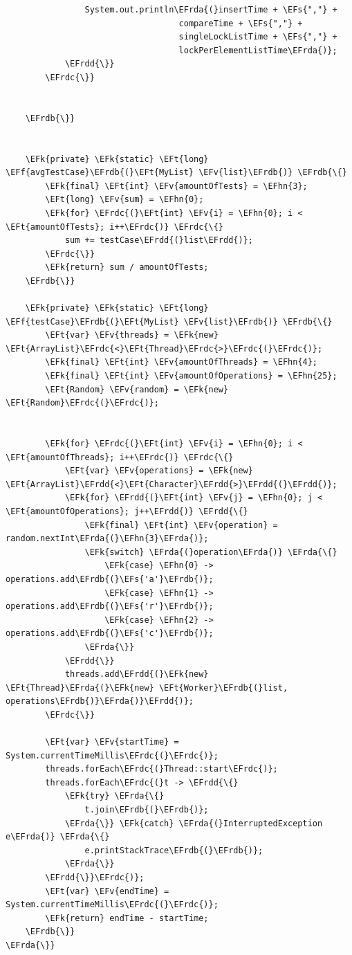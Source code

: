 \documentclass[11pt]{article}
\newcommand{\EFs}[1]{\textcolor{EFs}{#1}} %
\newcommand{\EFk}[1]{\textcolor{EFk}{#1}} %
\newcommand{\EFf}[1]{\textcolor{EFf}{#1}} %
\newcommand{\EFv}[1]{\textcolor{EFv}{#1}} %
\newcommand{\EFt}[1]{\textcolor{EFt}{#1}} %
\newcommand{\EFhn}[1]{\textcolor{EFhn}{#1}} %
\newcommand{\EFrda}[1]{#1} %
\newcommand{\EFrdb}[1]{\textcolor{EFrdb}{#1}} %
\newcommand{\EFrdc}[1]{\textcolor{EFrdc}{#1}} %
\newcommand{\EFrdd}[1]{\textcolor{EFrdd}{#1}} %
\begin{document}
\begin{Code}
\begin{Verbatim}
                System.out.println\EFrda{(}insertTime + \EFs{","} +
                                   compareTime + \EFs{","} +
                                   singleLockListTime + \EFs{","} +
                                   lockPerElementListTime\EFrda{)};
            \EFrdd{\}}
        \EFrdc{\}}


    \EFrdb{\}}


    \EFk{private} \EFk{static} \EFt{long} \EFf{avgTestCase}\EFrdb{(}\EFt{MyList} \EFv{list}\EFrdb{)} \EFrdb{\{}
        \EFk{final} \EFt{int} \EFv{amountOfTests} = \EFhn{3};
        \EFt{long} \EFv{sum} = \EFhn{0};
        \EFk{for} \EFrdc{(}\EFt{int} \EFv{i} = \EFhn{0}; i < \EFt{amountOfTests}; i++\EFrdc{)} \EFrdc{\{}
            sum += testCase\EFrdd{(}list\EFrdd{)};
        \EFrdc{\}}
        \EFk{return} sum / amountOfTests;
    \EFrdb{\}}

    \EFk{private} \EFk{static} \EFt{long} \EFf{testCase}\EFrdb{(}\EFt{MyList} \EFv{list}\EFrdb{)} \EFrdb{\{}
        \EFt{var} \EFv{threads} = \EFk{new} \EFt{ArrayList}\EFrdc{<}\EFt{Thread}\EFrdc{>}\EFrdc{(}\EFrdc{)};
        \EFk{final} \EFt{int} \EFv{amountOfThreads} = \EFhn{4};
        \EFk{final} \EFt{int} \EFv{amountOfOperations} = \EFhn{25};
        \EFt{Random} \EFv{random} = \EFk{new} \EFt{Random}\EFrdc{(}\EFrdc{)};


        \EFk{for} \EFrdc{(}\EFt{int} \EFv{i} = \EFhn{0}; i < \EFt{amountOfThreads}; i++\EFrdc{)} \EFrdc{\{}
            \EFt{var} \EFv{operations} = \EFk{new} \EFt{ArrayList}\EFrdd{<}\EFt{Character}\EFrdd{>}\EFrdd{(}\EFrdd{)};
            \EFk{for} \EFrdd{(}\EFt{int} \EFv{j} = \EFhn{0}; j < \EFt{amountOfOperations}; j++\EFrdd{)} \EFrdd{\{}
                \EFk{final} \EFt{int} \EFv{operation} = random.nextInt\EFrda{(}\EFhn{3}\EFrda{)};
                \EFk{switch} \EFrda{(}operation\EFrda{)} \EFrda{\{}
                    \EFk{case} \EFhn{0} -> operations.add\EFrdb{(}\EFs{'a'}\EFrdb{)};
                    \EFk{case} \EFhn{1} -> operations.add\EFrdb{(}\EFs{'r'}\EFrdb{)};
                    \EFk{case} \EFhn{2} -> operations.add\EFrdb{(}\EFs{'c'}\EFrdb{)};
                \EFrda{\}}
            \EFrdd{\}}
            threads.add\EFrdd{(}\EFk{new} \EFt{Thread}\EFrda{(}\EFk{new} \EFt{Worker}\EFrdb{(}list, operations\EFrdb{)}\EFrda{)}\EFrdd{)};
        \EFrdc{\}}

        \EFt{var} \EFv{startTime} = System.currentTimeMillis\EFrdc{(}\EFrdc{)};
        threads.forEach\EFrdc{(}Thread::start\EFrdc{)};
        threads.forEach\EFrdc{(}t -> \EFrdd{\{}
            \EFk{try} \EFrda{\{}
                t.join\EFrdb{(}\EFrdb{)};
            \EFrda{\}} \EFk{catch} \EFrda{(}InterruptedException e\EFrda{)} \EFrda{\{}
                e.printStackTrace\EFrdb{(}\EFrdb{)};
            \EFrda{\}}
        \EFrdd{\}}\EFrdc{)};
        \EFt{var} \EFv{endTime} = System.currentTimeMillis\EFrdc{(}\EFrdc{)};
        \EFk{return} endTime - startTime;
    \EFrdb{\}}
\EFrda{\}}
\end{Verbatim}
\end{Code}
\end{document}
